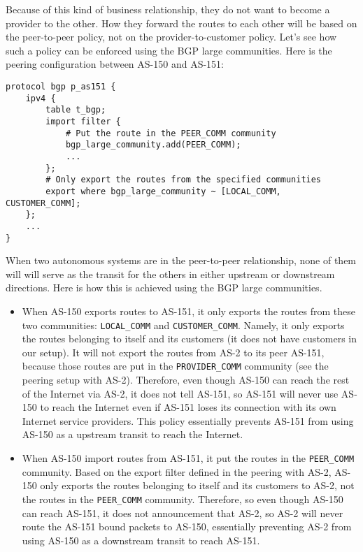 Because of this kind of business relationship, they do not want to
become a provider to the other. How they forward the routes to each other 
will be based on the peer-to-peer policy, 
not on the provider-to-customer policy. Let's see how such a policy
can be enforced using the BGP large communities. 
Here is the peering configuration between AS-150 and AS-151:

\begin{lstlisting}
protocol bgp p_as151 {
    ipv4 {
        table t_bgp;
        import filter {
            # Put the route in the PEER_COMM community
            bgp_large_community.add(PEER_COMM);
            ...
        };
        # Only export the routes from the specified communities
        export where bgp_large_community ~ [LOCAL_COMM, CUSTOMER_COMM];
    };
    ...
}
\end{lstlisting}

When two autonomous systems are in the peer-to-peer relationship, none of them
will will serve as the transit for the others in either upstream or 
downstream directions. Here is how this is achieved using the BGP 
large communities.

\begin{itemize}
  \item When AS-150 exports routes to AS-151, it only exports the routes
    from these two communities: \texttt{LOCAL\_COMM} and \texttt{CUSTOMER\_COMM}.
    Namely, it only exports the routes belonging to itself and its 
    customers (it does not have customers in our setup). It will not export the 
    routes from AS-2 to its peer AS-151, because those routes are put in the 
    \texttt{PROVIDER\_COMM} community (see the peering setup with AS-2).
    Therefore, even though AS-150 can reach the rest of the Internet via AS-2,
    it does not tell AS-151, so AS-151 will never use AS-150 to reach the 
    Internet even if AS-151 loses its connection with its own Internet service
    providers. This policy essentially prevents AS-151 from using AS-150 
    as a upstream transit to reach the Internet.


  \item When AS-150 import routes from AS-151, it put the routes in
    the \texttt{PEER\_COMM} community. Based on the export 
    filter defined in the peering with AS-2, 
    AS-150 only exports the routes belonging to itself and its 
    customers to AS-2, not the routes in the \texttt{PEER\_COMM} community. 
    Therefore, so even though AS-150 can reach AS-151, it does not announcement that
    AS-2, so AS-2 will never route the AS-151 bound packets to AS-150, 
    essentially preventing AS-2 from using AS-150 as 
    a downstream transit to reach AS-151.
\end{itemize}
 





